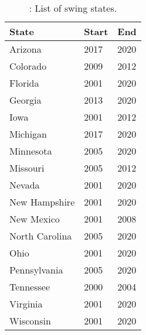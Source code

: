 \begin{table}[!h]

\caption{\label{tab:swing-list}: List of swing states.}
\centering
\fontsize{10}{12}\selectfont
\begin{tabular}[t]{lll}
\toprule
State & Start & End\\
\midrule
Arizona & 2017 & 2020\\
Colorado & 2009 & 2012\\
Florida & 2001 & 2020\\
Georgia & 2013 & 2020\\
Iowa & 2001 & 2012\\
Michigan & 2017 & 2020\\
Minnesota & 2005 & 2020\\
Missouri & 2005 & 2012\\
Nevada & 2001 & 2020\\
New Hampshire & 2001 & 2020\\
New Mexico & 2001 & 2008\\
North Carolina & 2005 & 2020\\
Ohio & 2001 & 2020\\
Pennsylvania & 2005 & 2020\\
Tennessee & 2000 & 2004\\
Virginia & 2001 & 2020\\
Wisconsin & 2001 & 2020\\
\bottomrule
\end{tabular}
\end{table}
